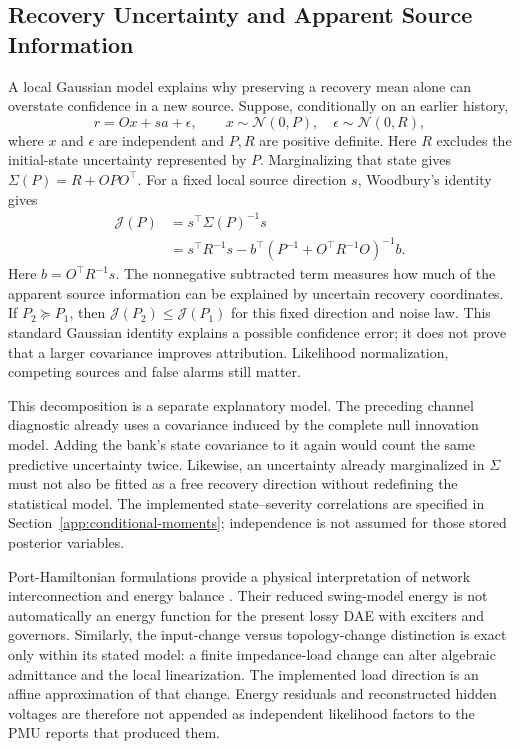 \subsection{Recovery Uncertainty and Apparent Source Information}
\label{app:recovery-information}

A local Gaussian model explains why preserving a recovery mean alone
can overstate confidence in a new source. Suppose, conditionally on an
earlier history,
\[
 r=Ox+sa+\epsilon,\qquad
 x\sim\mathcal N(0,P),\quad\epsilon\sim\mathcal N(0,R),
\]
where $x$ and $\epsilon$ are independent and $P,R$ are positive definite.
Here $R$ excludes the initial-state uncertainty represented by $P$.
Marginalizing that state gives $\Sigma(P)=R+OPO^\top$.
For a fixed local source direction $s$, Woodbury's identity gives
\begin{align}
 \mathcal J(P)&=s^\top\Sigma(P)^{-1}s\nonumber\\
 &=s^\top R^{-1}s
 -b^\top(P^{-1}+O^\top R^{-1}O)^{-1}b.
\end{align}
Here $b=O^\top R^{-1}s$. The nonnegative subtracted term measures how much of the apparent
source information can be explained by uncertain recovery coordinates.
If $P_2\succeq P_1$, then
$\mathcal J(P_2)\le\mathcal J(P_1)$ for this fixed direction and noise
law. This standard Gaussian identity explains a possible confidence
error; it does not prove that a larger covariance improves attribution.
Likelihood normalization, competing sources and false alarms still matter.

This decomposition is a separate explanatory model. The preceding channel
diagnostic already uses a covariance induced by the complete null
innovation model. Adding the bank's state covariance to it again would
count the same predictive uncertainty twice. Likewise, an uncertainty
already marginalized in $\Sigma$ must not also be fitted as a free
recovery direction without redefining the statistical model. The
implemented state--severity correlations are specified in
Section~\ref{app:conditional-moments}; independence is not assumed for
those stored posterior variables.

Port-Hamiltonian formulations provide a physical interpretation of
network interconnection and energy balance \cite{fiaz2013port}.
Their reduced swing-model energy is not automatically an energy function
for the present lossy DAE with exciters and governors. Similarly, the
input-change versus topology-change distinction is exact only within
its stated model: a finite impedance-load change can alter algebraic
admittance and the local linearization. The implemented load direction
is an affine approximation of that change. Energy residuals and
reconstructed hidden voltages are therefore not appended as independent
likelihood factors to the PMU reports that produced them.
